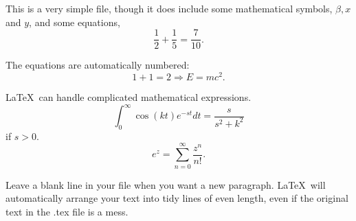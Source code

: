 \documentclass[12pt]{article}
\begin{document}
  This is a very simple file, though it does include some mathematical
  symbols, $\beta, x$ and $y$,  and some equations,
 \begin{equation}
 \frac{1}{2} + \frac{1}{5} =  \frac{7}{10}.
  \end{equation}

 The equations are automatically numbered:
\begin{equation}
 1 + 1 = 2 \Rightarrow E = m c^2.
\end{equation}

  \LaTeX\ can handle complicated mathematical expressions.
 \begin{equation}
 \int_0^\infty \cos (k t) e^{-s t} d t = \frac{s}{s^2 + k^2}
 \end{equation}
 if $s > 0$.
 \begin{equation}
 e^z = \sum_{n=0}^\infty \frac{ z^n}{n!} .
 \end{equation}

 Leave a blank line in your file when you want a new paragraph.
      \LaTeX\ will automatically
 arrange your text
              into tidy lines of
 even length, even
 if the
 original text in the .tex file is a mess.
\end{document}
